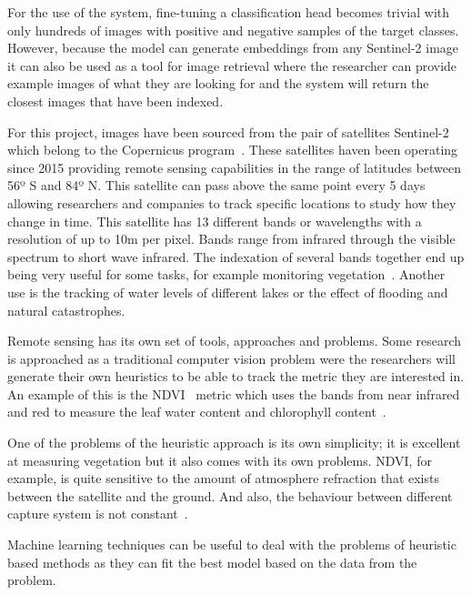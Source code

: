 \documentclass[conference]{IEEEtran}
\begin{document}
    For the use of the system, fine-tuning a classification head becomes trivial with only hundreds of images with positive and negative
    samples of the target classes.
    However, because the model can generate embeddings from any Sentinel-2 image it can also be used as a tool for image retrieval
    where the researcher can provide example images of what they are looking for and the system will return the closest images that
    have been indexed.

    For this project, images have been sourced from the pair of satellites Sentinel-2~\cite{sentinel-2} which belong to the Copernicus program~\cite{whatiscopernicus}.
    These satellites haven been operating since 2015 providing remote sensing capabilities in the range of latitudes between 56º S and 84º N\@.
    This satellite can pass above the same point every 5 days allowing researchers and companies to track specific locations
    to study how they change in time.
    This satellite has 13 different bands or wavelengths with a resolution of up to 10m per pixel.
    Bands range from infrared through the visible spectrum to short wave infrared.
    The indexation of several bands together end up being very useful for some tasks, for example monitoring vegetation~\cite{TUCKER1979127}.
    Another use is the tracking of water levels of different lakes or the effect of flooding and natural catastrophes.

    Remote sensing has its own set of tools, approaches and problems.
    Some research is approached as a traditional computer vision problem were the researchers will
    generate their own heuristics to be able to track the metric they are interested in.
    An example of this is the NDVI~\cite{NDVIsource} metric which uses the bands from near infrared and red to
    measure the leaf water content and chlorophyll content~\cite{TUCKER1979127}.

    One of the problems of the heuristic approach is its own simplicity; it is excellent at measuring
    vegetation but it also comes with its own problems.
    NDVI, for example, is quite sensitive to the amount of atmosphere refraction that exists between the satellite and the ground.
    And also, the behaviour between different capture system is not constant~\cite{Huang2021}.

    Machine learning techniques can be useful to deal with the problems of heuristic based methods as they can fit the best model
    based on the data from the problem.
\end{document}
